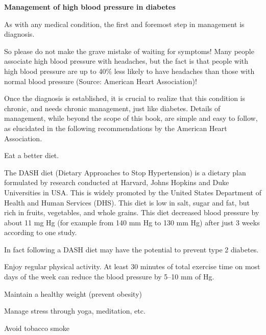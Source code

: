 {\textbf{Management of high blood pressure in diabetes}

As with any medical condition, the first and foremost step in management is diagnosis.

 So please do not make the grave mistake of waiting for symptoms! Many people associate high blood pressure with headaches, but the fact is that people with high blood pressure are up to 40\% less likely to have headaches than those with normal blood pressure (Source: American Heart Association)!


Once the diagnosis is established, it is crucial to realize that this condition is chronic, and needs chronic management, just like diabetes. Details of management, while beyond the scope of this book, are simple and easy to follow, as elucidated in the following recommendations by the American Heart Association.

\item 
 Eat a better diet.

 The DASH diet (Dietary Approaches to Stop Hypertension) is a dietary plan formulated by research conducted at Harvard, Johns Hopkins and Duke Universities in USA. This is widely promoted by the United States Department of Health and Human Services (DHS). This diet is low in salt, sugar and fat, but rich in fruits, vegetables, and whole grains. This diet decreased blood pressure by about 11 mg Hg (for example from 140 mm Hg to 130 mm Hg) after just 3 weeks according to one study.\supskpt{\footnote{}}

 In fact following a DASH diet may have the potential to prevent type 2 diabetes.\supskpt{\footnote{}}

 \item Enjoy regular physical activity. At least 30 minutes of total exercise time on most days of the week can reduce the blood pressure by 5–10 mm of Hg.

 \item Maintain a healthy weight (prevent obesity)

 \item Manage stress through yoga, meditation, etc.

 \item Avoid tobacco smoke

}
